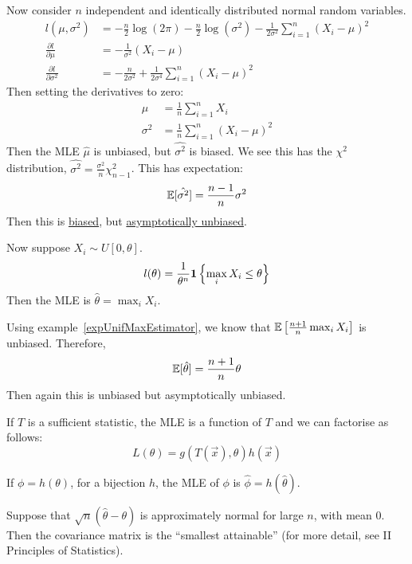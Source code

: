 \documentclass[../Main.tex]{subfiles}
\begin{document}
\begin{example}
    Now consider $n$ independent and identically distributed normal random variables.
    \begin{align*}
        l(\mu, \sigma^2) &= -\frac{n}{2} \log(2\pi) - \frac{n}{2} \log(\sigma^2) - \frac{1}{2\sigma^2} \sum_{i=1}^{n} \left(X_i - \mu\right)^2 \\
        \frac{\partial l}{\partial \mu} &= -\frac{1}{\sigma^2} \left(X_i - \mu\right) \\
        \frac{\partial l}{\partial \sigma^2} &= -\frac{n}{2\sigma^2} + \frac{1}{2\sigma^4} \sum_{i=1}^{n} (X_i - \mu)^2
    \end{align*}
    Then setting the derivatives to zero:
    \begin{align*}
        \mu &= \frac{1}{n} \sum_{i=1}^{n} X_i \\
        \sigma^2 &= \frac1n \sum_{i=1}^{n} (X_i - \mu)^2
    \end{align*}
    Then the MLE $\hat{\mu}$ is unbiased, but $\hat{\sigma^2}$ is biased. We see this has the $\chi^2$ distribution, $\hat{\sigma^2} = \frac{\sigma^2}{n} \chi_{n-1}^2$. This has expectation:
    \begin{equation*}
        \mathbb{E}[\hat{\sigma^2}] = \frac{n-1}{n} \sigma^2
    \end{equation*}
    Then this is \underline{biased}, but \underline{asymptotically unbiased}.
\end{example}
\begin{example}
    Now suppose $X_i \sim U[0, \theta]$.
    \begin{equation*}
        l(\theta) = \frac{1}{\theta^n} \boldsymbol{1}\left\{\max_i X_i \leq \theta\right\}
    \end{equation*}
    Then the MLE is $\hat{\theta} = \max_i X_i$.

    Using example~\ref{expUnifMaxEstimator}, we know that $\mathbb{E}\left[\frac{n+1}{n} \max_i X_i\right]$ is unbiased. Therefore,
    \begin{equation*}
        \mathbb{E}[\hat{\theta}] = \frac{n+1}{n} \theta
    \end{equation*}
    Then again this is unbiased but asymptotically unbiased.
\end{example}
\begin{propositions}{
        \label{propsMLEProperties}
    }
    \item If $T$ is a sufficient statistic, the MLE is a function of $T$ and we can factorise as follows:
        \begin{equation*}
            L(\theta) = g(T(\vec{x}), \theta) h(\vec{x})
        \end{equation*}
    \item If $\phi = h(\theta)$, for a bijection $h$, the MLE of $\phi$ is $\hat{\phi} = h(\hat{\theta})$.
    \item Suppose that $\sqrt{n} \left(\hat{\theta} - \theta\right)$ is approximately normal for large $n$, with mean $0$. Then the covariance matrix is the ``smallest attainable'' (for more detail, see II Principles of Statistics).
\end{propositions}
\end{document}
